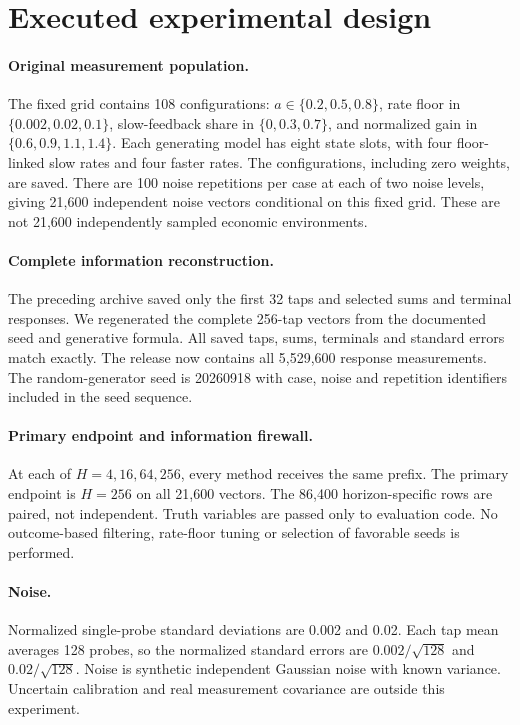 \documentclass[11pt]{article}
\theoremstyle{remark}\newtheorem{remark}[proposition]{Remark}
\begin{document}
\section{Executed experimental design}\label{sec:design}
\paragraph{Original measurement population.}
The fixed grid contains 108 configurations: $a\in\{0.2,0.5,0.8\}$, rate floor in $\{0.002,0.02,0.1\}$, slow-feedback share in $\{0,0.3,0.7\}$, and normalized gain in $\{0.6,0.9,1.1,1.4\}$. Each generating model has eight state slots, with four floor-linked slow rates and four faster rates. The configurations, including zero weights, are saved. There are 100 noise repetitions per case at each of two noise levels, giving 21,600 independent noise vectors conditional on this fixed grid. These are not 21,600 independently sampled economic environments.

\paragraph{Complete information reconstruction.}
The preceding archive saved only the first 32 taps and selected sums and terminal responses. We regenerated the complete 256-tap vectors from the documented seed and generative formula. All saved taps, sums, terminals and standard errors match exactly. The release now contains all 5,529,600 response measurements. The random-generator seed is 20260918 with case, noise and repetition identifiers included in the seed sequence.

\paragraph{Primary endpoint and information firewall.}
At each of $H=4,16,64,256$, every method receives the same prefix. The primary endpoint is $H=256$ on all 21,600 vectors. The 86,400 horizon-specific rows are paired, not independent. Truth variables are passed only to evaluation code. No outcome-based filtering, rate-floor tuning or selection of favorable seeds is performed.

\paragraph{Noise.}
Normalized single-probe standard deviations are 0.002 and 0.02. Each tap mean averages 128 probes, so the normalized standard errors are $0.002/\sqrt{128}$ and $0.02/\sqrt{128}$. Noise is synthetic independent Gaussian noise with known variance. Uncertain calibration and real measurement covariance are outside this experiment.
\end{document}
